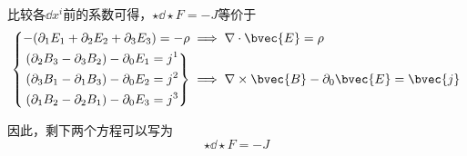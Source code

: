 比较各$\dd x^i$前的系数可得，$\star \dd \star F = -J$等价于
\begin{equation}
\left\{
\begin{aligned}
-(\partial_1E_1+\partial_2E_2+\partial_3E_3) = -\rho&\implies \nabla\cdot \bvec{E}=\rho\\
\left.
\begin{aligned}
(\partial_2B_3-\partial_3B_2)-\partial_0E_1 ={}& j^1\\
(\partial_3B_1-\partial_1B_3)-\partial_0E_2 ={}& j^2\\
(\partial_1B_2-\partial_2B_1)-\partial_0E_3 ={}& j^3
\end{aligned}
\right\}&
\implies \nabla\times \bvec{B}-\partial_0\bvec{E}=\bvec{j}
\end{aligned}
\right. 
\end{equation}



因此，剩下两个方程可以写为
\begin{equation}
    \star \dd \star F = -J
\end{equation}





























